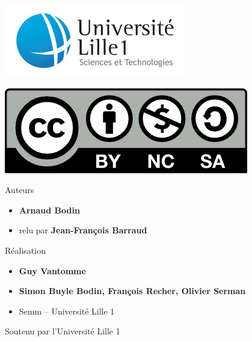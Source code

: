 







\begin{frame}

\thispagestyle{empty}    

  \hspace*{-20ex}
  \begin{minipage}{0.6\textwidth}
  \begin{center}
    \vspace*{5ex}   


    \bigskip

    \includegraphics[scale=0.3]{../divers/logotypeLille1-QUADRI-ECRAN.jpg}

    \vspace*{5ex}

    \includegraphics[scale=0.5]{../divers/by-nc-sa.png}
  \end{center}
  \end{minipage}
  \hfil
  \begin{minipage}{0.65\textwidth}
  \vspace*{5ex}
  Auteurs
  \begin{itemize}
    \item {\bf Arnaud Bodin}
    \item relu par {\bf  \small Jean-François Barraud}
  \end{itemize}

  \medskip

  Réalisation
  \begin{itemize}
    \item {\bf Guy Vantomme}
    \item {\bf \small Simon Buyle Bodin, François Recher, Olivier Serman}     
    \item Semm -- Université Lille 1
  \end{itemize}

  \medskip

  Soutenu par l'Université Lille 1


  \end{minipage}  



\end{frame}


